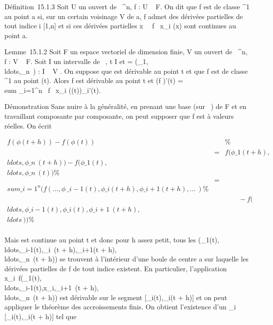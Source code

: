 \documentclass[]{article}
\begin{document}
Définition~15.1.3 Soit U un ouvert de ~^n, f : U \rightarrow~ F. On dit
que f est de classe ^1 au point a si, sur un certain
voisinage V de a, f admet des dérivées partielles de tout indice i \in
{[}1,n{]} et si ces dérivées partielles x\mapsto~
\partial~f \over \partial~x\_i (x) sont continues au point a.

Lemme~15.1.2 Soit F un espace vectoriel de dimension finie, V un ouvert
de ~^n, f : V \rightarrow~ F. Soit I un intervalle de ~, t \in I et \phi =
(\phi\_1,\\ldots,\phi\_n~)
: I \rightarrow~ V . On suppose que \phi est dérivable au point t et que f est de
classe ^1 au point \phi(t). Alors f \cdot \phi est dérivable au point
t et (f \cdot \phi)'(t) =\ \\sum
 \_i=1^n \partial~f \over \partial~x\_i
(\phi(t))\phi\_i'(t).

Démonstration Sans nuire à la généralité, en prenant une base (sur ~) de
F et en travaillant composante par composante, on peut supposer que f
est à valeurs réelles. On écrit

\begin{align*} f(\phi(t + h)) - f(\phi(t))&& \%&
\\ & =& f(\phi\_1(t +
h),\\ldots,\phi\_n~(t
+ h)) -
f(\phi\_1(t),\\ldots,\phi\_n~(t))
\%& \\ & =& \\sum
\_i=1^n(f(\ldots,\phi~\_
i-1(t),\phi\_i(t + h),\phi\_i+1(t +
h),\ldots~)\%&
\\ & & \qquad -
f(\\ldots,\phi\_i-1(t),\phi\_i(t),\phi\_i+1~(t
+ h),\\ldots~)) \%&
\\ \end{align*}

Mais \phi est continue au point t et donc pour h assez petit, tous les
(\phi\_1(t),\\ldots,\phi\_i-1(t),\phi\_i~(t
+ h),\phi\_i+1(t +
h),\\ldots,\phi\_n~(t
+ h)) se trouvent à l'intérieur d'une boule de centre a sur laquelle les
dérivées partielles de f de tout indice existent. En particulier,
l'application
x\_i\mapsto~f(\phi\_1(t),\\ldots,\phi\_i-1(t),x\_i,\phi\_i+1~(t
+
h),\\ldots,\phi\_n~(t
+ h)) est dérivable sur le segment {[}\phi\_i(t),\phi\_i(t +
h){]} et on peut appliquer le théorème des accroissements finis. On
obtient l'existence d'un \xi\_i \in
{[}\phi\_i(t),\phi\_i(t + h){]} tel que
\end{document}

